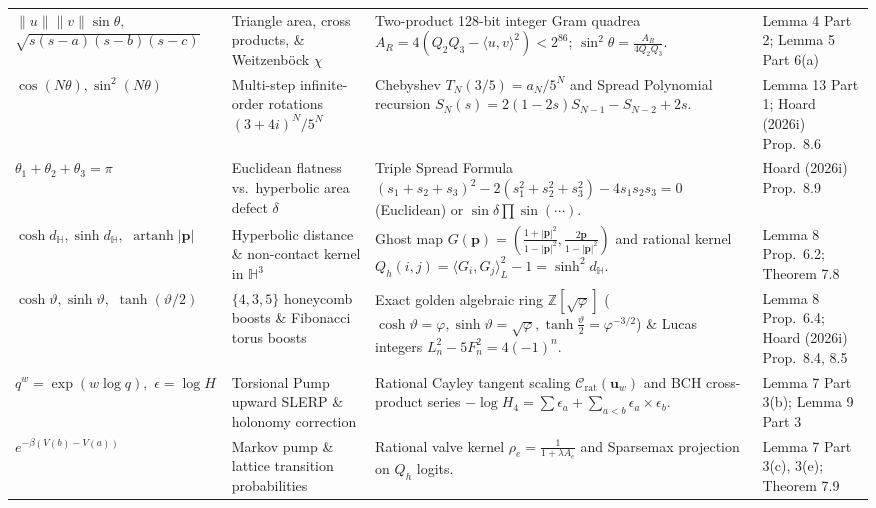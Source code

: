 \documentclass[11pt, a4paper]{article}
\begin{document}
\begin{longtable}{@{}p{3.2cm}p{3.8cm}p{4.8cm}p{2.8cm}@{}}
\addlinespace
$\|u\|\|v\|\sin\theta,$ \newline $\sqrt{s(s-a)(s-b)(s-c)}$ & Triangle area, cross products, \& Weitzenb\"ock $\chi$ & Two-product 128-bit integer Gram quadrea $A_R = 4(Q_2 Q_3 - \langle u,v\rangle^2) < 2^{86}$; $\sin^2\theta = \frac{A_R}{4Q_2 Q_3}$. & Lemma 4 Part 2; Lemma 5 Part 6(a) \\
\addlinespace
$\cos(N\theta), \sin^2(N\theta)$ & Multi-step infinite-order rotations $(3+4i)^N/5^N$ & Chebyshev $T_N(3/5) = a_N/5^N$ and Spread Polynomial recursion $S_N(s) = 2(1-2s)S_{N-1} - S_{N-2} + 2s$. & Lemma 13 Part 1; Hoard (2026i) Prop.~8.6 \\
\addlinespace
$\theta_1 + \theta_2 + \theta_3 = \pi$ & Euclidean flatness vs.\ hyperbolic area defect $\delta$ & Triple Spread Formula $(s_1+s_2+s_3)^2 - 2(s_1^2+s_2^2+s_3^2) - 4s_1 s_2 s_3 = 0$ (Euclidean) or $\sin\delta\prod\sin(\cdots)$. & Hoard (2026i) Prop.~8.9 \\
\addlinespace
$\cosh d_{\mathbb{H}}, \sinh d_{\mathbb{H}},$ \newline $\operatorname{artanh}|\mathbf{p}|$ & Hyperbolic distance \& non-contact kernel in $\mathbb{H}^3$ & Ghost map $G(\mathbf{p}) = \left(\frac{1+|\mathbf{p}|^2}{1-|\mathbf{p}|^2}, \frac{2\mathbf{p}}{1-|\mathbf{p}|^2}\right)$ and rational kernel $Q_h(i,j) = \langle G_i, G_j\rangle_L^2 - 1 = \sinh^2 d_{\mathbb{H}}$. & Lemma 8 Prop.~6.2; Theorem 7.8 \\
\addlinespace
$\cosh\vartheta, \sinh\vartheta,$ \newline $\tanh(\vartheta/2)$ & $\{4,3,5\}$ honeycomb boosts \& Fibonacci torus boosts & Exact golden algebraic ring $\mathbb{Z}[\sqrt{\varphi}]$ ($\cosh\vartheta = \varphi, \sinh\vartheta = \sqrt{\varphi}, \tanh\frac{\vartheta}{2} = \varphi^{-3/2}$) \& Lucas integers $L_n^2 - 5F_n^2 = 4(-1)^n$. & Lemma 8 Prop.~6.4; Hoard (2026i) Prop.~8.4, 8.5 \\
\addlinespace
$q^w = \exp(w\log q),$ \newline $\epsilon = \log H$ & Torsional Pump upward SLERP \& holonomy correction & Rational Cayley tangent scaling $\mathcal{C}_{\text{rat}}(\mathbf{u}_w)$ and BCH cross-product series $-\log H_4 = \sum \epsilon_a + \sum_{a<b}\epsilon_a \times \epsilon_b$. & Lemma 7 Part 3(b); Lemma 9 Part 3 \\
\addlinespace
$e^{-\beta(V(b)-V(a))}$ & Markov pump \& lattice transition probabilities & Rational valve kernel $\rho_e = \frac{1}{1+\lambda A_e}$ and Sparsemax projection on $Q_h$ logits. & Lemma 7 Part 3(c), 3(e); Theorem 7.9 \\
\bottomrule
\end{longtable}
\end{document}
